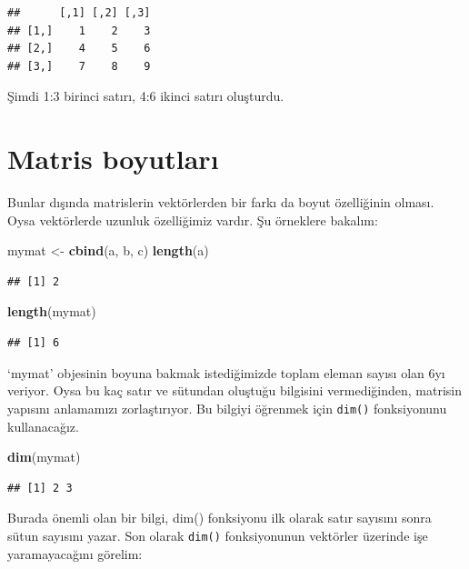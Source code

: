 \documentclass[]{book}
\newenvironment{Shaded}{\begin{snugshade}}{\end{snugshade}}
\newcommand{\KeywordTok}[1]{\textcolor[rgb]{0.13,0.29,0.53}{\textbf{#1}}}
\newcommand{\NormalTok}[1]{#1}
\newcommand{\StringTok}[1]{\textcolor[rgb]{0.31,0.60,0.02}{#1}}
\begin{document}
\begin{verbatim}
##      [,1] [,2] [,3]
## [1,]    1    2    3
## [2,]    4    5    6
## [3,]    7    8    9
\end{verbatim}

Şimdi 1:3 birinci satırı, 4:6 ikinci satırı oluşturdu.

\hypertarget{matris-boyutlar}{%
\section{Matris boyutları}\label{matris-boyutlar}}

Bunlar dışında matrislerin vektörlerden bir farkı da boyut özelliğinin
olması. Oysa vektörlerde uzunluk özelliğimiz vardır. Şu örneklere
bakalım:

\begin{Shaded}
\begin{Highlighting}[]
\NormalTok{mymat <-}\StringTok{ }\KeywordTok{cbind}\NormalTok{(a, b, c)}
\KeywordTok{length}\NormalTok{(a)}
\end{Highlighting}
\end{Shaded}

\begin{verbatim}
## [1] 2
\end{verbatim}

\begin{Shaded}
\begin{Highlighting}[]
\KeywordTok{length}\NormalTok{(mymat)}
\end{Highlighting}
\end{Shaded}

\begin{verbatim}
## [1] 6
\end{verbatim}

`mymat' objesinin boyuna bakmak istediğimizde toplam eleman sayısı olan
6yı veriyor. Oysa bu kaç satır ve sütundan oluştuğu bilgisini
vermediğinden, matrisin yapısını anlamamızı zorlaştırıyor. Bu bilgiyi
öğrenmek için \texttt{dim()} fonksiyonunu kullanacağız.

\begin{Shaded}
\begin{Highlighting}[]
\KeywordTok{dim}\NormalTok{(mymat)}
\end{Highlighting}
\end{Shaded}

\begin{verbatim}
## [1] 2 3
\end{verbatim}

Burada önemli olan bir bilgi, dim() fonksiyonu ilk olarak satır sayısını
sonra sütun sayısını yazar. Son olarak \texttt{dim()} fonksiyonunun
vektörler üzerinde işe yaramayacağını görelim:
\end{document}
